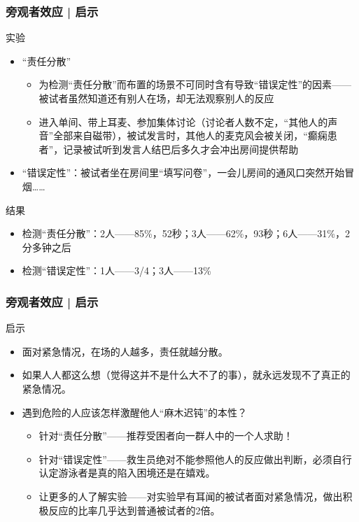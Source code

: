 \begin{frame}
  \frametitle{旁观者效应 | 启示}
  \begin{block}{实验}
    \begin{itemize}
      \item “责任分散”
        \begin{itemize}
          \item 为检测“责任分散”而布置的场景不可同时含有导致“错误定性”的因素——被试者虽然知道还有别人在场，却无法观察别人的反应
          \item 进入单间、带上耳麦、参加集体讨论（讨论者人数不定，“其他人的声音”全部来自磁带），被试发言时，其他人的麦克风会被关闭，“癫痫患者”，记录被试听到发言人结巴后多久才会冲出房间提供帮助
        \end{itemize}
      \item “错误定性”：被试者坐在房间里“填写问卷”，一会儿房间的通风口突然开始冒烟……
    \end{itemize}
  \end{block}
  \pause
  \begin{block}{结果}
    \begin{itemize}
      \item 检测“责任分散”：2人——85\%，52秒；3人——62\%，93秒；6人——31\%，2分多钟之后
      \item 检测“错误定性”：1人——3/4；3人——13\%
    \end{itemize}
  \end{block}
\end{frame}

\begin{frame}
  \frametitle{旁观者效应 | 启示}
  \begin{block}{启示}
    \begin{itemize}
      \item 面对紧急情况，在场的人越多，责任就越分散。
      \item 如果人人都这么想（觉得这并不是什么大不了的事），就永远发现不了真正的紧急情况。
      \item 遇到危险的人应该怎样激醒他人“麻木迟钝”的本性？
        \begin{itemize}
          \item 针对“责任分散”——\alert{推荐受困者向一群人中的一个人求助！}
          \item 针对“错误定性”——救生员绝对不能参照他人的反应做出判断，必须自行认定游泳者是真的陷入困境还是在嬉戏。
          \item 让更多的人了解实验——对实验早有耳闻的被试者面对紧急情况，做出积极反应的比率几乎达到普通被试者的2倍。
        \end{itemize}
    \end{itemize}
  \end{block}
\end{frame}

